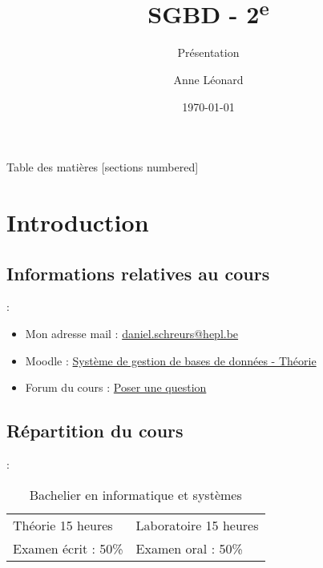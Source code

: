 \documentclass[10pt]{beamer}
\title{SGBD - 2\textsuperscript{e}}
\subtitle{Présentation}
\date{\today}
\author{Anne Léonard}
\institute{Haute École de la Province de Liège}
\begin{document}
\maketitle

\begin{frame}[allowframebreaks]{Table des matières}
    [sections numbered]
    \tableofcontents
\end{frame}

\section{Introduction}

\subsection{Informations relatives au cours}
\begin{frame}{\secname : \subsecname}
    \begin{itemize}
        \item Mon adresse mail : \href{mailto:daniel.schreurs@hepl.be}{daniel.schreurs@hepl.be}
        \item Moodle : \href{https://moodle.ecolevirtuelle.be/course/view.php?id=25655}{Système de gestion de bases de données - Théorie}
        \item Forum du cours : \href{https://moodle.ecolevirtuelle.be/mod/forum/view.php?id=183803}{Poser une question}
    \end{itemize}
\end{frame}

\subsection{Répartition du cours}
\begin{frame}{\secname : \subsecname}
    \begin{table}[]
        \begin{tabular}{ll}
            Théorie 15 heures   & Laboratoire 15 heures \\
            Examen écrit : 50\% & Examen oral : 50\%
        \end{tabular}
        \caption*{Bachelier en informatique et systèmes}
    \end{table}
\end{frame}
\end{document}
